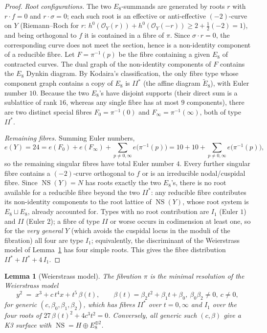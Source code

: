 \documentclass[11pt]{article}
\newtheorem{lemma}[theorem]{Lemma}
\DeclareMathOperator{\NS}{NS}
\begin{document}
\begin{proof}
\emph{Root configurations.} The two $E_8$-summands are generated by roots
$r$ with $r\cdot f=0$ and $r\cdot\sigma=0$; each such root is an effective
or anti-effective $(-2)$-curve on $Y$ (Riemann--Roch for $r$: $h^0(\mathcal
O_Y(r))+h^0(\mathcal O_Y(-r))\ge 2+\frac12(-2)=1$), and being orthogonal
to $f$ it is contained in a fibre of $\pi$. Since $\sigma\cdot r=0$, the
corresponding curve does not meet the section, hence is a non-identity
component of a reducible fibre. Let $F=\pi^{-1}(p)$ be the fibre containing
a given $E_8$ of contracted curves. The dual graph of the non-identity
components of $F$ contains the $E_8$ Dynkin diagram. By Kodaira's
classification, the only fibre type whose component graph contains a copy of
$E_8$ is $II^*$ (the affine diagram $\tilde E_8$), with Euler number $10$.
Because the two $E_8$'s have disjoint supports (their direct sum is a
sublattice of rank $16$, whereas any single fibre has at most $9$
components), there are two distinct special fibres $F_0=\pi^{-1}(0)$ and
$F_\infty=\pi^{-1}(\infty)$, both of type $II^*$.

\emph{Remaining fibres.} Summing Euler numbers,
\[
e(Y)=24= e(F_0)+e(F_\infty)+\sum_{p\ne 0,\infty} e\bigl(\pi^{-1}(p)\bigr)
=10+10+\sum_{p\ne0,\infty}e\bigl(\pi^{-1}(p)\bigr),
\]
so the remaining singular fibres have total Euler number $4$. Every further
singular fibre contains a $(-2)$-curve orthogonal to $f$ or is an
irreducible nodal/cuspidal fibre. Since $\NS(Y)=N$ has roots exactly the
two $E_8$'s, there is no root available for a reducible fibre beyond the two
$II^*$: any reducible fibre contributes its non-identity components to the
root lattice of $\NS(Y)$, whose root system is $E_8\sqcup E_8$, already
accounted for. Types with no root contribution are $I_1$ (Euler $1$) and
$II$ (Euler $2$); a fibre of type $II$ or worse occurs in codimension at
least one, so for the \emph{very general} $Y$ (which avoids the cuspidal
locus in the moduli of the fibration) all four are type $I_1$; equivalently,
the discriminant of the Weierstrass model of Lemma~\ref{lem:weierstrass}
has four simple roots. This gives the fibre distribution
$II^*+II^*+4\,I_1$.
\end{proof}

\begin{lemma}[Weierstrass model]\label{lem:weierstrass}
The fibration $\pi$ is the minimal resolution of the Weierstrass model
\[
y^2 \;=\; x^3 + c\, t^4 x + t^5\,\beta(t),\qquad
\beta(t)=\beta_2 t^2+\beta_1 t+\beta_0,\ \beta_0\beta_2\neq 0,\ c\neq 0,
\]
for generic $(c,\beta_0,\beta_1,\beta_2)$, which has fibres $II^*$ over
$t=0,\infty$ and $I_1$ over the four roots of $27\,\beta(t)^2 + 4 c^3 t^2 =
0$. Conversely, all generic such $(c,\beta)$ give a K3 surface with
$\NS = H\oplus E_8^{\oplus 2}$.
\end{lemma}
\end{document}

